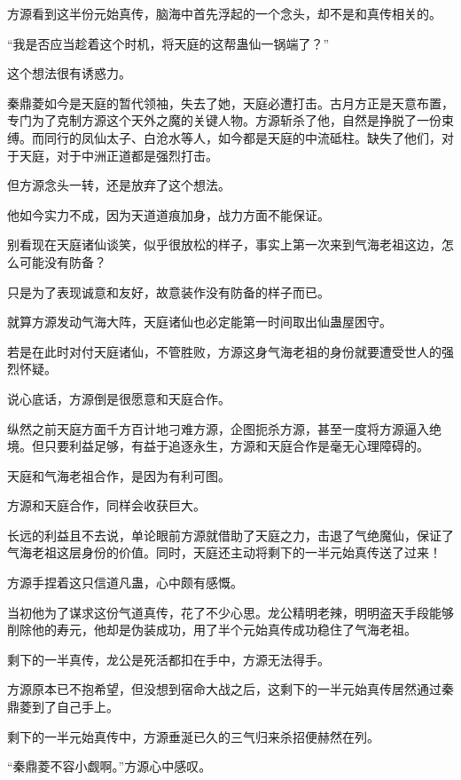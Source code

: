 
\begin{this_body}

方源看到这半份元始真传，脑海中首先浮起的一个念头，却不是和真传相关的。

“我是否应当趁着这个时机，将天庭的这帮蛊仙一锅端了？”

这个想法很有诱惑力。

秦鼎菱如今是天庭的暂代领袖，失去了她，天庭必遭打击。古月方正是天意布置，专门为了克制方源这个天外之魔的关键人物。方源斩杀了他，自然是挣脱了一份束缚。而同行的凤仙太子、白沧水等人，如今都是天庭的中流砥柱。缺失了他们，对于天庭，对于中洲正道都是强烈打击。

但方源念头一转，还是放弃了这个想法。

他如今实力不成，因为天道道痕加身，战力方面不能保证。

别看现在天庭诸仙谈笑，似乎很放松的样子，事实上第一次来到气海老祖这边，怎么可能没有防备？

只是为了表现诚意和友好，故意装作没有防备的样子而已。

就算方源发动气海大阵，天庭诸仙也必定能第一时间取出仙蛊屋困守。

若是在此时对付天庭诸仙，不管胜败，方源这身气海老祖的身份就要遭受世人的强烈怀疑。

说心底话，方源倒是很愿意和天庭合作。

纵然之前天庭方面千方百计地刁难方源，企图扼杀方源，甚至一度将方源逼入绝境。但只要利益足够，有益于追逐永生，方源和天庭合作是毫无心理障碍的。

天庭和气海老祖合作，是因为有利可图。

方源和天庭合作，同样会收获巨大。

长远的利益且不去说，单论眼前方源就借助了天庭之力，击退了气绝魔仙，保证了气海老祖这层身份的价值。同时，天庭还主动将剩下的一半元始真传送了过来！

方源手捏着这只信道凡蛊，心中颇有感慨。

当初他为了谋求这份气道真传，花了不少心思。龙公精明老辣，明明盗天手段能够削除他的寿元，他却是伪装成功，用了半个元始真传成功稳住了气海老祖。

剩下的一半真传，龙公是死活都扣在手中，方源无法得手。

方源原本已不抱希望，但没想到宿命大战之后，这剩下的一半元始真传居然通过秦鼎菱到了自己手上。

剩下的一半元始真传中，方源垂涎已久的三气归来杀招便赫然在列。

“秦鼎菱不容小觑啊。”方源心中感叹。


\end{this_body}
